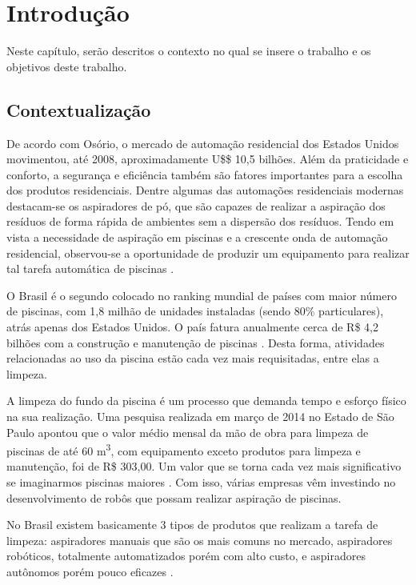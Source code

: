 \chapter{Introdução}
Neste capítulo, serão descritos o contexto no qual se insere o trabalho e os
objetivos deste trabalho.

\section{Contextualização}
De acordo com Osório, o mercado de automação residencial dos Estados Unidos
movimentou, até 2008, aproximadamente U\$\$ 10,5 bilhões. Além da praticidade
e conforto, a segurança e eficiência também são fatores importantes para a
escolha dos produtos residenciais. Dentre algumas das automações residenciais
modernas destacam-se os aspiradores de pó, que são capazes de realizar a aspiração
dos resíduos de forma rápida de ambientes sem a dispersão dos resíduos. Tendo
em vista a necessidade de aspiração em piscinas e a crescente onda de automação
residencial, observou-se a oportunidade de produzir um equipamento para realizar
tal tarefa automática de piscinas \cite{kanno2014}.

O Brasil é o segundo colocado no ranking mundial de países com maior número de
piscinas, com 1,8 milhão de unidades instaladas (sendo 80\% particulares), atrás
apenas dos Estados Unidos. O país fatura anualmente cerca de R\$ 4,2 bilhões com
a construção e manutenção de piscinas \cite{portalfatorbrasil2013}. Desta forma,
atividades relacionadas ao uso da piscina estão cada vez mais requisitadas, entre
elas a limpeza.

A limpeza do fundo da piscina é um processo que demanda tempo e esforço físico na
sua realização. Uma pesquisa realizada em março de 2014 no Estado de São Paulo
apontou que o valor médio mensal da mão de obra para limpeza de piscinas de até
60 m\textsuperscript{3}, com equipamento exceto produtos para limpeza e manutenção,
foi de R\$ 303,00. Um valor que se torna cada vez mais significativo se imaginarmos
piscinas maiores \cite{datafolha2014}. Com isso, várias empresas vêm investindo
no desenvolvimento de robôs que possam realizar aspiração de piscinas. 

No Brasil existem basicamente 3 tipos de produtos que realizam a tarefa de limpeza:
aspiradores manuais que são os mais comuns no mercado, aspiradores robóticos,
totalmente automatizados porém com alto custo, e aspiradores autônomos porém pouco
eficazes \cite{miura2006}.

